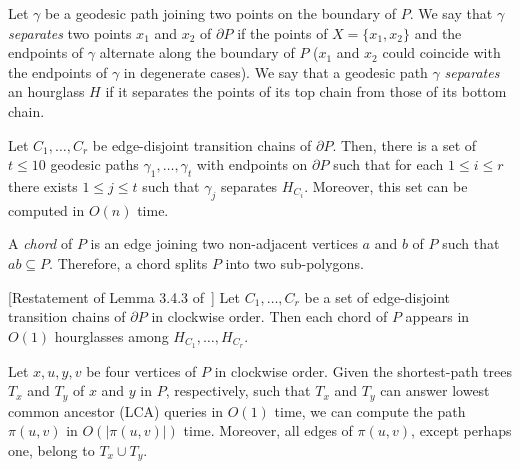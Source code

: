 \documentclass[a4paper,UKenglish]{lipics}
\newcommand{\p}[2]{\ensuremath{\pi(#1, #2)}}
\begin{document}
Let $\gamma$ be a  geodesic path joining two points on the boundary of $P$.
We say that $\gamma$ \emph{separates} two points $x_1$ and $x_2$ of $\partial P$ if the points of $X=\{x_1, x_2\}$ and the endpoints of $\gamma$ alternate along the boundary of $P$ ($x_1$ and $x_2$ could coincide with the endpoints of $\gamma$ in degenerate cases). We say that a geodesic path $\gamma$ \emph{separates} an hourglass $H$ if it separates the points of its top chain from those of its  bottom chain.

\begin{lemma}\label{lemma:Split paths}
Let $C_1, \ldots, C_r$ be edge-disjoint transition chains of $\partial P$. Then, there is a set of $t \leq 10$ geodesic paths $\gamma_1, \ldots, \gamma_t$ with endpoints on $\partial P$ such that for each $1\leq i\leq r$ there exists $1\leq j\leq t$ such that $\gamma_j$ separates $H_{C_i}$.
Moreover, this set can be computed in $O(n)$ time.
\end{lemma}

A \emph{chord} of $P$ is an edge joining two non-adjacent vertices $a$ and $b$ of $P$ such that $ab\subseteq P$. Therefore, a chord splits $P$ into two sub-polygons.

\begin{lemma}\label{lemma:Edges appear a constant number of times}
[Restatement of Lemma 3.4.3 of~\cite{aronov1993furthest}]
Let $C_1, \ldots, C_r$ be a set of edge-disjoint transition chains of $\partial P$ in clockwise order. Then each chord of $P$ appears in $O(1)$ hourglasses among $H_{C_1}, \ldots, H_{C_r}$.
\end{lemma}


\begin{lemma}\label{lemma:Suri's lemma}
Let $x, u, y, v$ be four vertices of $P$ in clockwise order.
Given the shortest-path trees $T_x$ and $T_y$ of $x$ and $y$ in $P$, respectively, such that $T_x$ and $T_y$ can answer lowest common ancestor (LCA) queries in $O(1)$ time, 
we can compute the path $\p{u}{v}$ in $O(|\p{u}{v}|)$ time. 
Moreover, all edges of $\p{u}{v}$, except perhaps one, belong to $T_x\cup T_y$.
\end{lemma}
\end{document}

